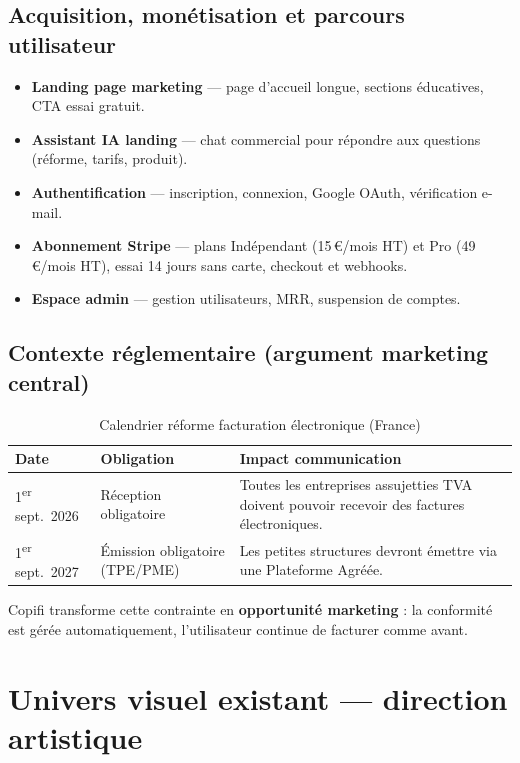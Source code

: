 \documentclass[11pt,a4paper]{report}
\newcommand{\feat}[1]{\textbf{#1}}
\begin{document}
\section{Acquisition, monétisation et parcours utilisateur}

\begin{itemize}[leftmargin=*]
    \item \feat{Landing page marketing} — page d'accueil longue, sections éducatives, CTA essai gratuit.
    \item \feat{Assistant IA landing} — chat commercial pour répondre aux questions (réforme, tarifs, produit).
    \item \feat{Authentification} — inscription, connexion, Google OAuth, vérification e-mail.
    \item \feat{Abonnement Stripe} — plans Indépendant (15\,€/mois HT) et Pro (49\,€/mois HT),
    essai 14 jours sans carte, checkout et webhooks.
    \item \feat{Espace admin} — gestion utilisateurs, MRR, suspension de comptes.
\end{itemize}

\section{Contexte réglementaire (argument marketing central)}

\begin{table}[h]
\centering
\caption{Calendrier réforme facturation électronique (France)}
\begin{tabular}{@{}llp{8.5cm}@{}}
\toprule
\textbf{Date} & \textbf{Obligation} & \textbf{Impact communication} \\
\midrule
1\textsuperscript{er} sept.\ 2026 & Réception obligatoire & Toutes les entreprises assujetties TVA doivent pouvoir recevoir des factures électroniques. \\
1\textsuperscript{er} sept.\ 2027 & Émission obligatoire (TPE/PME) & Les petites structures devront émettre via une Plateforme Agréée. \\
\bottomrule
\end{tabular}
\end{table}

Copifi transforme cette contrainte en \textbf{opportunité marketing} : la conformité est gérée
automatiquement, l'utilisateur continue de facturer comme avant.

\chapter{Univers visuel existant — direction artistique}
\label{ch:univers}
\end{document}
